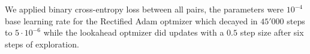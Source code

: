 \documentclass[a4paper,12pt]{article}
\begin{document}
\vspace{4mm}

\par We applied binary cross-entropy loss between all pairs, the parameters were $10^{-4}$ base learning rate for the Rectified Adam optmizer which decayed in $45'000$ steps to $5 \cdot 10^{-6}$ while the lookahead optmizer did updates with a $0.5$ step size after six steps of exploration.

\newpage



\end{document}
